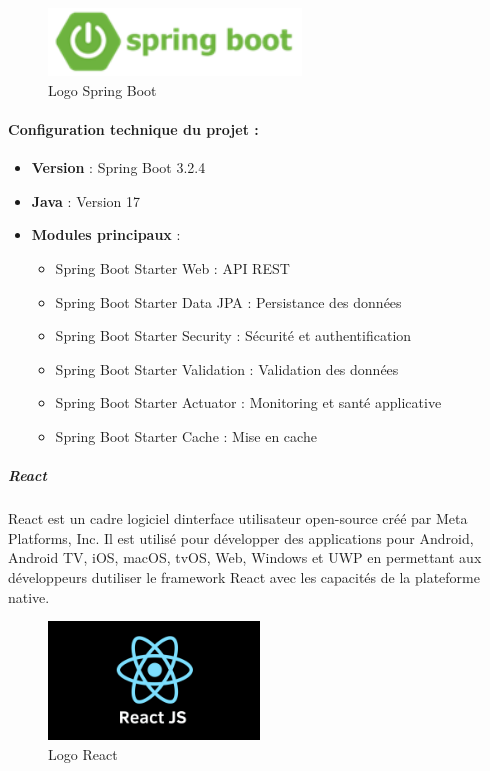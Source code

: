 \documentclass[12pt,a4paper,twoside]{report}
\begin{document}
\begin{figure}[H]
\centering
\includegraphics[width=0.6\textwidth]{latex_media/media/image23.png}
\caption{Logo Spring Boot}
\label{fig:logo-spring-boot}
\end{figure}

\hypertarget{configuration-technique-du-projet}{%
\paragraph{Configuration technique du projet
:}\label{configuration-technique-du-projet}}

\begin{itemize}
\item
  \textbf{Version} : Spring Boot 3.2.4
\item
  \textbf{Java} : Version 17
\item
  \textbf{Modules principaux} :

  \begin{itemize}
  \item
    Spring Boot Starter Web : API REST
  \item
    Spring Boot Starter Data JPA : Persistance des données
  \item
    Spring Boot Starter Security : Sécurité et authentification
  \item
    Spring Boot Starter Validation : Validation des données
  \item
    Spring Boot Starter Actuator : Monitoring et santé applicative
  \item
    Spring Boot Starter Cache : Mise en cache
  \end{itemize}
\end{itemize}

\hypertarget{react}{%
\subparagraph{React}\label{react}}

React est un cadre logiciel d\textquotesingle interface utilisateur
open-source créé par Meta Platforms, Inc. Il est utilisé pour développer
des applications pour Android, Android TV, iOS, macOS, tvOS, Web,
Windows et UWP en permettant aux développeurs d\textquotesingle utiliser
le framework React avec les capacités de la plateforme native.

\begin{figure}[H]
\centering
\includegraphics[width=0.5\textwidth]{latex_media/media/image24.png}
\caption{Logo React}
\label{fig:logo-react}
\end{figure}
\end{document}
